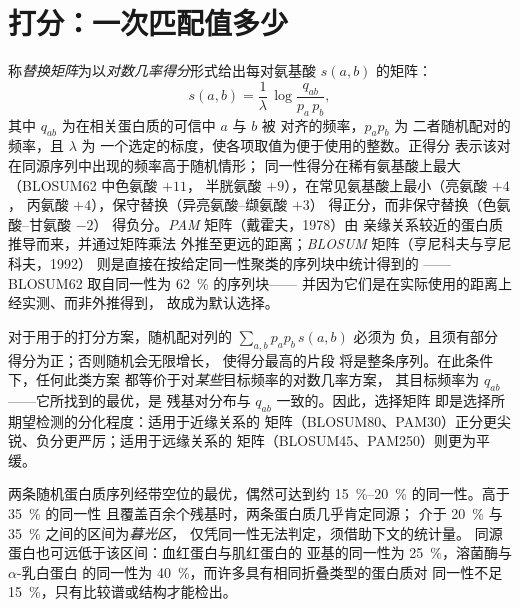 \section{打分：一次匹配值多少}

\begin{definition}[替换矩阵]\label{def:b3:bioinformatics:matrices}
称\emph{替换矩阵}为以\emph{对数几率得分}形式给出每对氨基酸
$s(a,b)$ 的矩阵：
\[
s(a,b) = \frac{1}{\lambda}\,\log\frac{q_{ab}}{p_{a}\,p_{b}},
\]
其中 $q_{ab}$ 为在相关蛋白质的可信中 $a$ 与 $b$ 被
对齐的频率，$p_{a} p_{b}$ 为
二者随机配对的频率，且 $\lambda$ 为
一个选定的标度，使各项取值为便于使用的整数。正得分
表示该对在同源序列中出现的频率高于随机情形；
同一性得分在稀有氨基酸上最大（BLOSUM62 中色氨酸 $+11$，
半胱氨酸 $+9$），在常见氨基酸上最小（亮氨酸 $+4$，
丙氨酸 $+4$），保守替换（异亮氨酸–缬氨酸 $+3$）
得正分，而非保守替换（色氨酸–甘氨酸 $-2$）
得负分。\emph{PAM} 矩阵（戴霍夫，1978）由
亲缘关系较近的蛋白质推导而来，并通过矩阵乘法
外推至更远的距离；\emph{BLOSUM} 矩阵（亨尼科夫与亨尼科夫，1992）
则是直接在按给定同一性聚类的序列块中统计得到的
——BLOSUM62 取自同一性为 \qty{62}{\%} 的序列块——
并因为它们是在实际使用的距离上经实测、而非外推得到，
故成为默认选择。
\end{definition}

\begin{proposition}[为何采用对数几率]\label{prop:b3:bioinformatics:logodds}
对于用于的打分方案，随机配对列的
$\sum_{a,b} p_{a} p_{b}\, s(a,b)$ 必须为
负，且须有部分得分为正；否则随机会无限增长，
使得分最高的片段
将是整条序列。在此条件下，任何此类方案
都等价于对\emph{某些}目标频率的对数几率方案，
其目标频率为 $q_{ab}$——它所找到的最优，是
残基对分布与 $q_{ab}$ 一致的。因此，选择矩阵
即是选择所期望检测的分化程度：适用于近缘关系的
矩阵（BLOSUM80、PAM30）正分更尖锐、负分更严厉；适用于远缘关系的
矩阵（BLOSUM45、PAM250）则更为平缓。
\end{proposition}
\admitted

\begin{example}\label{ex:b3:bioinformatics:twilight}
两条随机蛋白质序列经带空位的最优，偶然可达到约
\qtyrange{15}{20}{\%} 的同一性。高于 \qty{35}{\%} 的同一性
且覆盖百余个残基时，两条蛋白质几乎肯定同源；
介于 \qty{20}{\%} 与 \qty{35}{\%} 之间的区间为\emph{暮光区}，
仅凭同一性无法判定，须借助下文的统计量。
同源蛋白也可远低于该区间：血红蛋白与肌红蛋白的
亚基的同一性为 \qty{25}{\%}，溶菌酶与 $\alpha$-乳白蛋白
的同一性为 \qty{40}{\%}，而许多具有相同折叠类型的蛋白质对
同一性不足 \qty{15}{\%}，只有比较谱或结构才能检出。
\end{example}

